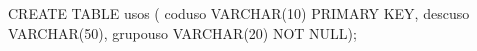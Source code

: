 \lstset{caption=Crear tabla ``usos'',label=sql:crearTablaUsos}
\begin{SQL}
CREATE TABLE usos (
coduso VARCHAR(10) PRIMARY KEY,
descuso VARCHAR(50),
grupouso VARCHAR(20) NOT NULL);
\end{SQL}
